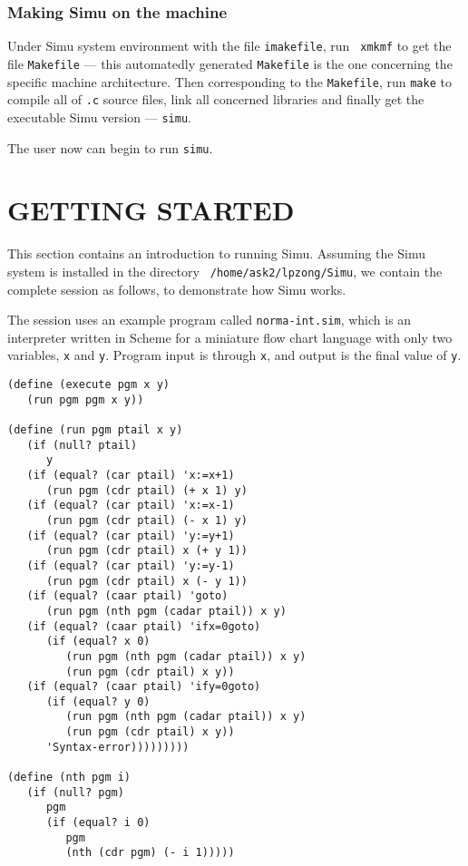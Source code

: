 \begin{sloppypar}
\subsubsection{Making Simu on the machine}


Under Simu system environment with the file {\tt imakefile}, run {\tt
xmkmf} to get the file {\tt Makefile} --- this automatedly generated
{\tt Makefile} is the one concerning the specific machine
architecture. Then corresponding to the {\tt Makefile}, run {\tt make}
to compile all of {\tt *.c} source files, link all concerned libraries
and finally get the executable Simu version --- {\tt simu}.

The user now can begin to run {\tt simu}.



\section{GETTING STARTED}


This section contains an introduction to running Simu. Assuming the
Simu system is installed in the directory {\tt
/home/ask2/lpzong/Simu}, we contain the complete session as follows,
to demonstrate how Simu works.

The session uses an example program called {\tt norma-int.sim}, which
is an interpreter written in Scheme for a miniature flow chart
language with only two variables, {\tt x} and {\tt y}. Program input
is through {\tt x}, and output is the final value of {\tt y}.

\begin{verbatim}
(define (execute pgm x y)
   (run pgm pgm x y))

(define (run pgm ptail x y)
   (if (null? ptail)
      y
   (if (equal? (car ptail) 'x:=x+1)
      (run pgm (cdr ptail) (+ x 1) y)
   (if (equal? (car ptail) 'x:=x-1)
      (run pgm (cdr ptail) (- x 1) y)
   (if (equal? (car ptail) 'y:=y+1)
      (run pgm (cdr ptail) x (+ y 1))
   (if (equal? (car ptail) 'y:=y-1)
      (run pgm (cdr ptail) x (- y 1))
   (if (equal? (caar ptail) 'goto)
      (run pgm (nth pgm (cadar ptail)) x y)
   (if (equal? (caar ptail) 'ifx=0goto)
      (if (equal? x 0)
         (run pgm (nth pgm (cadar ptail)) x y)
         (run pgm (cdr ptail) x y))
   (if (equal? (caar ptail) 'ify=0goto)
      (if (equal? y 0)
         (run pgm (nth pgm (cadar ptail)) x y)
         (run pgm (cdr ptail) x y))
      'Syntax-error)))))))))

(define (nth pgm i)
   (if (null? pgm)
      pgm
      (if (equal? i 0)
         pgm
         (nth (cdr pgm) (- i 1)))))
\end{verbatim}


\end{sloppypar}
